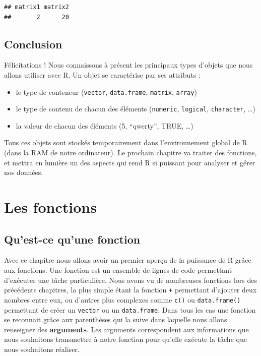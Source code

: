 \documentclass[
]{book}
\providecommand{\tightlist}{%
  \setlength{\itemsep}{0pt}\setlength{\parskip}{0pt}}
\begin{document}
\begin{verbatim}
## matrix1 matrix2 
##       2      20
\end{verbatim}

\hypertarget{conclusion-3}{%
\section{Conclusion}\label{conclusion-3}}

Félicitations ! Nous connaissons à présent les principaux types d'objets que nous allons utiliser avec R. Un objet se caractérise par ses attributs :

\begin{itemize}
\tightlist
\item
  le type de conteneur (\texttt{vector}, \texttt{data.frame}, \texttt{matrix}, \texttt{array})
\item
  le type de contenu de chacun des éléments (\texttt{numeric}, \texttt{logical}, \texttt{character}, \ldots)
\item
  la valeur de chacun des éléments (5, ``qwerty'', TRUE, \ldots)
\end{itemize}

Tous ces objets sont stockés temporairement dans l'environnement global de R (dans la RAM de notre ordinateur). Le prochain chapitre va traiter des fonctions, et mettra en lumière un des aspects qui rend R si puissant pour analyser et gérer nos données.

\hypertarget{fonctions}{%
\chapter{Les fonctions}\label{fonctions}}

\hypertarget{quest-ce-quune-fonction}{%
\section{Qu'est-ce qu'une fonction}\label{quest-ce-quune-fonction}}

Avec ce chapitre nous allons avoir un premier aperçu de la puissance de R grâce aux fonctions. Une fonction est un ensemble de lignes de code permettant d'exécuter une tâche particulière. Nous avons vu de nombreuses fonctions lors des précédents chapitres, la plus simple étant la fonction \texttt{+} permettant d'ajouter deux nombres entre eux, ou d'autres plus complexes comme \texttt{c()} ou \texttt{data.frame()} permettant de créer un \texttt{vector} ou un \texttt{data.frame}. Dans tous les cas une fonction se reconnait grâce aux parenthèses qui la suive dans laquelle nous allons renseigner des \textbf{arguments}. Les arguments correspondent aux informations que nous souhaitons transmettre à notre fonction pour qu'elle exécute la tâche que nous souhaitons réaliser.
\end{document}
